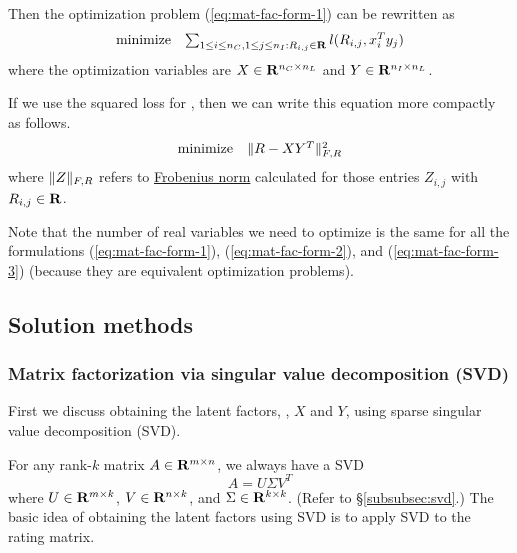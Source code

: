 Then the optimization problem (\ref{eq:mat-fac-form-1}) can be rewritten as
\begin{equation}
\label{eq:mat-fac-form-2}
\begin{array}{ll}
\mbox{minimize} & \sum_{1\leq i\leq {n_C}, 1\leq j\leq {n_I}:R_{i,j} \in \mathbf{R}} l({R}_{i,j}, x_i^Ty_j)
\end{array}
\end{equation}
where the optimization variables are
$X\in\mathbf{R}^{{n_C}\times{n_L}}$
and
$Y\in\mathbf{R}^{{n_I}\times{n_L}}$.

If we use the squared loss for \lfcn, then we can write this equation more compactly as follows.
\begin{equation}
\label{eq:mat-fac-form-3}
\begin{array}{ll}
\mbox{minimize} & \|R - XY^T\|_{F,R}^2
\end{array}
\end{equation}
where $\|Z\|_{F,R}$ refers to \href{http://mathworld.wolfram.com/FrobeniusNorm.html}{Frobenius norm}
calculated for those entries $Z_{i,j}$ with $R_{i,j} \in\mathbf{R}$.

Note that the number of real variables we need to optimize is the same for all the formulations
(\ref{eq:mat-fac-form-1}),
(\ref{eq:mat-fac-form-2}),
and
(\ref{eq:mat-fac-form-3}) (because they are equivalent optimization problems).


\subsection{Solution methods}

\subsubsection{Matrix factorization via singular value decomposition (SVD)}


First we discuss obtaining the latent factors, \ie, $X$ and $Y$,
using sparse singular value decomposition (SVD).

For any rank-$k$ matrix $A\in\mathbf{R}^{m\times n}$, we always have a SVD
\begin{equation}
A = U \Sigma V^T
\end{equation}
where
$U\in\mathbf{R}^{m\times k}$,
$V\in\mathbf{R}^{n\times k}$,
and
$\Sigma\in\mathbf{R}^{k\times k}$.
(Refer to \S\ref{subsubsec:svd}.)
The basic idea of obtaining the latent factors using SVD is
to apply SVD to the rating matrix.

